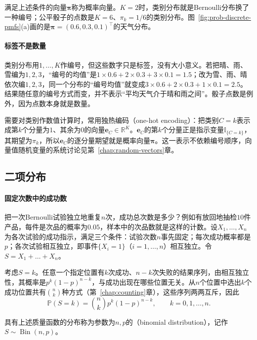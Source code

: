 满足上述条件的向量$\bm{\pi}$称为概率向量。$K=2$时，类别分布就是Bernoulli分布换了一种编号；公平骰子的点数是$K=6$、$\pi_k=1/6$的类别分布。图~\ref{fig:prob-discrete-pmfs}(a)画的是$\bm{\pi}=(0.6,0.3,0.1)^{\top}$的天气分布。

\paragraph{标签不是数量}
类别分布用$1,\dots,K$作编号，但这些数字只是标签，没有大小意义。若把晴、雨、雪编为$1,2,3$，“编号的均值”是$1\times0.6+2\times0.3+3\times0.1=1.5$；改为雪、雨、晴依次编$1,2,3$，同一个分布的“编号均值”就变成$3\times0.6+2\times0.3+1\times0.1=2.5$。结果随任意的编号方式而变，并不表示“平均天气介于晴和雨之间”。骰子点数是例外，因为点数本身就是数量。

需要对类别作数值计算时，常用独热编码（one-hot encoding）：把类别$C=k$表示成第$k$个分量为$1$、其余为$0$的向量$\bm{e}_C\in\mathbb{R}^K$。$\bm{e}_C$的第$k$个分量正是指示变量$\mathbb{I}_{\{C=k\}}$，其期望为$\pi_k$，所以$\bm{e}_C$的逐分量期望就是概率向量$\bm{\pi}$。这一表示不依赖编号顺序，向量值随机变量的系统讨论见第~\ref{chap:random-vectors}章。

\subsection{二项分布}
\label{sec:prob-binomial}

\paragraph{固定次数中的成功数}
把一次Bernoulli试验独立地重复$n$次，成功总次数是多少？例如有放回地抽检$10$件产品，每件是次品的概率为$0.05$，样本中的次品数就是这样的计数。设$X_1,\dots,X_n$为各次试验的成功指示，满足三个条件：试验次数$n$事先固定；每次成功概率都是$p$；各次试验相互独立，即事件$\{X_i=1\}$（$i=1,\dots,n$）相互独立。令$S=X_1+\dots+X_n$。

考虑$S=k$。任意一个指定位置有$k$次成功、$n-k$次失败的结果序列，由相互独立性，其概率是$p^k(1-p)^{n-k}$，与成功出现在哪些位置无关。从$n$个位置中选出$k$个成功位置共有$\binom nk$种方式（第~\ref{chap:counting}章），这些序列两两互斥，因此
\[
  \mathbb{P}(S=k)=\binom{n}{k}p^k(1-p)^{n-k},\qquad k=0,1,\dots,n .
\]

\begin{definition}[二项分布]
\label{def:prob-binomial}
具有上述质量函数的分布称为参数为$n,p$的（binomial distribution），记作$S\sim\operatorname{Bin}(n,p)$。
\end{definition}

